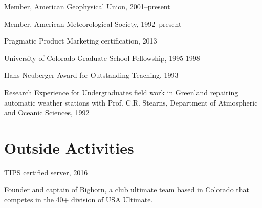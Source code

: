 \documentclass[letterpaper]{resume}
\begin{document}
\vspace{0.5em}
\begin{compactitem}[\itembullet]
  \item Member, American Geophysical Union, 2001--present
  \item Member, American Meteorological Society, 1992--present
  \item Pragmatic Product Marketing certification, 2013
  \item University of Colorado Graduate School Fellowship, 1995-1998
  \item Hans Neuberger Award for Outstanding Teaching, 1993
  \item Research Experience for Undergraduates field work in Greenland
    repairing automatic weather stations with Prof. C.R. Stearns,
    Department of Atmospheric and Oceanic Sciences, 1992
\end{compactitem}

\section{Outside Activities}

\vspace{0.5em}
\begin{compactitem}[\itembullet]
  \item TIPS certified server, 2016
  \item Founder and captain of Bighorn, a club ultimate team based in
    Colorado that competes in the 40+ division of USA Ultimate.
\end{compactitem}
\end{document}
